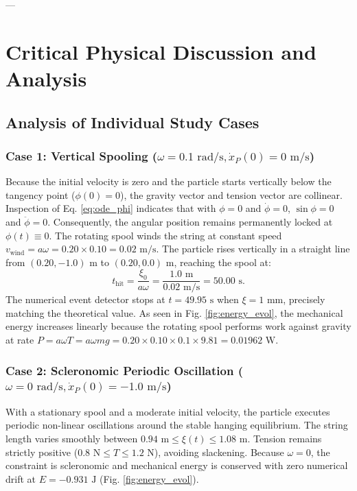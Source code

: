 \documentclass[11pt,a4paper]{article}
\begin{document}
---

\section{Critical Physical Discussion and Analysis}
\label{sec:discussion}

\subsection{Analysis of Individual Study Cases}

\subsubsection{Case 1: Vertical Spooling ($\omega = 0.1\text{ rad/s}, \dot{x}_P(0) = 0\text{ m/s}$)}
Because the initial velocity is zero and the particle starts vertically below the tangency point ($\phi(0) = 0$), the gravity vector and tension vector are collinear. Inspection of Eq. \eqref{eq:ode_phi} indicates that with $\phi = 0$ and $\dot{\phi} = 0$, $\sin\phi = 0$ and $\ddot{\phi} = 0$. Consequently, the angular position remains permanently locked at $\phi(t) \equiv 0$. The rotating spool winds the string at constant speed $v_{\text{wind}} = a\omega = 0.20 \times 0.10 = 0.02\text{ m/s}$. The particle rises vertically in a straight line from $(0.20, -1.0)\text{ m}$ to $(0.20, 0.0)\text{ m}$, reaching the spool at:
\begin{equation}
    t_{\text{hit}} = \frac{\xi_0}{a\omega} = \frac{1.0\text{ m}}{0.02\text{ m/s}} = 50.00\text{ s}.
\end{equation}
The numerical event detector stops at $t = 49.95\text{ s}$ when $\xi = 1\text{ mm}$, precisely matching the theoretical value. As seen in Fig. \ref{fig:energy_evol}, the mechanical energy increases linearly because the rotating spool performs work against gravity at rate $P = a\omega T = a\omega m g = 0.20 \times 0.10 \times 0.1 \times 9.81 = 0.01962\text{ W}$.

\subsubsection{Case 2: Scleronomic Periodic Oscillation ($\omega = 0\text{ rad/s}, \dot{x}_P(0) = -1.0\text{ m/s}$)}
With a stationary spool and a moderate initial velocity, the particle executes periodic non-linear oscillations around the stable hanging equilibrium. The string length varies smoothly between $0.94\text{ m} \le \xi(t) \le 1.08\text{ m}$. Tension remains strictly positive ($0.8\text{ N} \le T \le 1.2\text{ N}$), avoiding slackening. Because $\omega = 0$, the constraint is scleronomic and mechanical energy is conserved with zero numerical drift at $E = -0.931\text{ J}$ (Fig. \ref{fig:energy_evol}).
\end{document}
